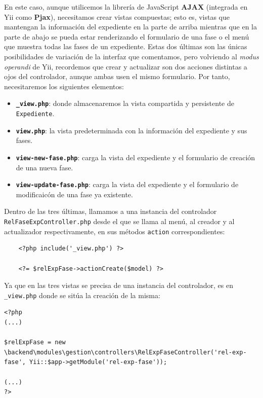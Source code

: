 En este caso, aunque utilicemos la librería de JavaScript \textbf{AJAX} (integrada en Yii como \textbf{Pjax}), necesitamos crear vistas compuestas; esto es, vistas que mantengan la información del expediente en la parte de arriba mientras que en la parte de abajo se pueda estar renderizando el formulario de una fase o el menú que muestra todas las fases de un expediente. Estas dos últimas son las únicas posibilidades de variación de la interfaz que comentamos, pero volviendo al \textit{modus operandi} de Yii, recordemos que crear y actualizar son dos acciones distintas a ojos del controlador, aunque ambas usen el mismo formulario. Por tanto, necesitaremos los siguientes elementos:

\begin{itemize}
	\item \textbf{\texttt{\_view.php}}: donde almacenaremos la vista compartida y persistente de \texttt{Expediente}.
	\item \textbf{\texttt{view.php}}: la vista predeterminada con la información del expediente y sus fases.
	\item \textbf{\texttt{view-new-fase.php}}: carga la vista del expediente y el formulario de creación de una nueva fase.
	\item \textbf{\texttt{view-update-fase.php}}: carga la vista del expediente y el formulario de modificaicón de una fase ya existente.
\end{itemize}

Dentro de las tres últimas, llamamos a una instancia del controlador \\ \texttt{RelFaseExpController.php} desde el que se llama al menú, al creador y al actualizador respectivamente, en sus métodos \texttt{action} correspondientes:

\begin{verbatim}
	<?php include('_view.php') ?>
	
	<?= $relExpFase->actionCreate($model) ?>
\end{verbatim}

Ya que en las tres vistas se precisa de una instancia del controlador, es en \texttt{\_view.php} donde se sitúa la creación de la misma:

\begin{verbatim}
<?php
(...)

$relExpFase = new \backend\modules\gestion\controllers\RelExpFaseController('rel-exp-fase', Yii::$app->getModule('rel-exp-fase'));

(...)
?>
\end{verbatim}

